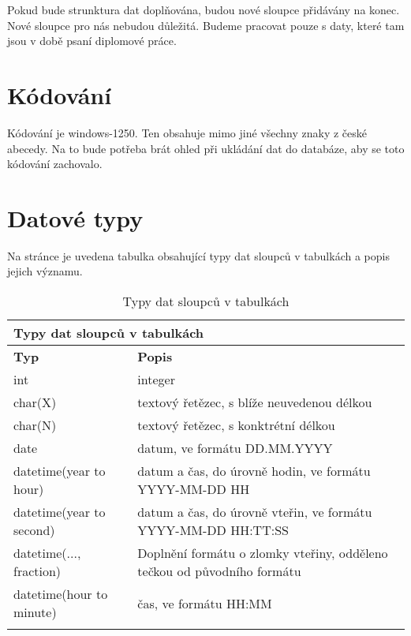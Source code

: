 Pokud bude strunktura dat doplňována, budou nové sloupce přidávány na konec. Nové sloupce pro nás nebudou důležitá. Budeme pracovat pouze s daty, které tam jsou v době psaní diplomové práce.

\section{Kódování}
Kódování je windows-1250. Ten obsahuje mimo jiné všechny znaky z české abecedy. Na to bude potřeba brát ohled při ukládání dat do databáze, aby se toto kódování zachovalo.

\section{Datové typy}
Na stránce je uvedena tabulka obsahující typy dat sloupců v tabulkách a popis jejich významu.

\begin{longtable}{|l|p{9cm}|} \hline
	\multicolumn{2}{|l|}{\textbf{Typy dat sloupců v tabulkách}} \\ \hline
	\textbf{Typ} & \textbf{Popis} \\ \hline
	
	int	& integer \\ \hline
	
	char(X)		& textový řetězec, s blíže neuvedenou délkou
	\\ \hline
	
	char(N)		& textový řetězec, s konktrétní délkou
	\\ \hline	
	
	date	& datum, ve formátu DD.MM.YYYY
	\\ \hline	
	
	datetime(year to hour)		& datum a čas, do úrovně hodin, ve formátu YYYY-MM-DD HH
	
	\\ \hline
	
	datetime(year to second)		& datum a čas, do úrovně vteřin, ve formátu YYYY-MM-DD HH:TT:SS
	
	\\ \hline
	
	datetime(..., fraction)		& Doplnění formátu o zlomky vteřiny, odděleno tečkou od původního formátu
	
	\\ \hline
	
	datetime(hour to minute)		& čas, ve formátu HH:MM
	\\ \hline
	
	\caption{Typy dat sloupců v tabulkách}
	\label{table:data_types}
\end{longtable}

